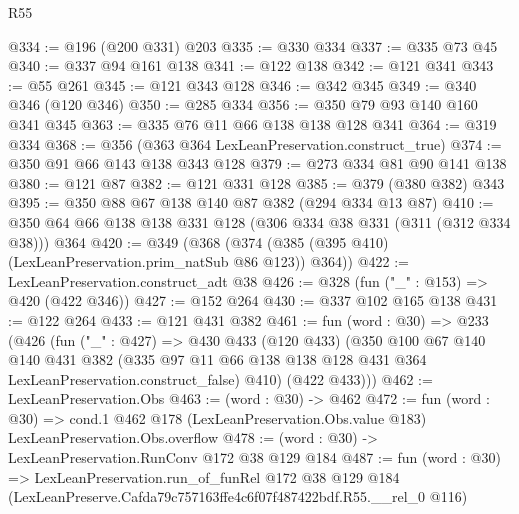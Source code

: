 \begin{lexlean}{R55}
\begin{coremodule}
@334 := @196 (@200 @331) @203
@335 := @330 @334
@337 := @335 @73 @45
@340 := @337 @94 @161 @138
@341 := @122 @138
@342 := @121 @341
@343 := @55 @261
@345 := @121 @343 @128
@346 := @342 @345
@349 := @340 @346 (@120 @346)
@350 := @285 @334
@356 := @350 @79 @93 @140 @160 @341 @345
@363 := @335 @76 @11 @66 @138 @138 @128 @341
@364 := @319 @334
@368 := @356 (@363 @364 LexLeanPreservation.construct_true)
@374 := @350 @91 @66 @143 @138 @343 @128
@379 := @273 @334 @81 @90 @141 @138
@380 := @121 @87
@382 := @121 @331 @128
@385 := @379 (@380 @382) @343
@395 := @350 @88 @67 @138 @140 @87 @382 (@294 @334 @13 @87)
@410 := @350 @64 @66 @138 @138 @331 @128 (@306 @334 @38 @331 (@311 (@312 @334 @38))) @364
@420 := @349 (@368 (@374 (@385 (@395 @410) (LexLeanPreservation.prim_natSub @86 @123)) @364))
@422 := LexLeanPreservation.construct_adt @38
@426 := @328 (fun ("_" : @153) => @420 (@422 @346))
@427 := @152 @264
@430 := @337 @102 @165 @138
@431 := @122 @264
@433 := @121 @431 @382
@461 := fun (word : @30) =>
  @233
    (@426
      (fun ("_" : @427) =>
      @430
        @433
        (@120 @433)
        (@350
          @100
          @67
          @140
          @140
          @431
          @382
          (@335 @97 @11 @66 @138 @138 @128 @431 @364 LexLeanPreservation.construct_false)
          @410)
        (@422 @433)))
@462 := LexLeanPreservation.Obs
@463 := (word : @30) -> @462
@472 := fun (word : @30) =>
  cond.{1} @462 @178 (LexLeanPreservation.Obs.value @183) LexLeanPreservation.Obs.overflow
@478 := (word : @30) -> LexLeanPreservation.RunConv @172 @38 @129 @184
@487 := fun (word : @30) =>
  LexLeanPreservation.run_of_funRel
    @172
    @38
    @129
    @184
    (LexLeanPreserve.Cafda79c757163ffe4c6f07f487422bdf.R55.__rel_0 @116)
\end{coremodule}
\end{lexlean}
